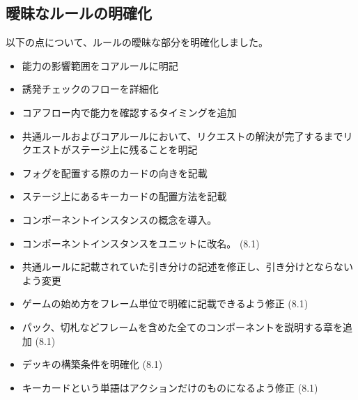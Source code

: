 \documentclass[letterpaper,10pt,dvipdfmx]{sphinxmanual}
\begin{document}
\subsection{曖昧なルールの明確化}
\label{\detokenize{revision-history/8th:id8}}
\sphinxAtStartPar
以下の点について、ルールの曖昧な部分を明確化しました。
\begin{itemize}
\item {} 
\sphinxAtStartPar
能力の影響範囲をコアルールに明記

\item {} 
\sphinxAtStartPar
誘発チェックのフローを詳細化

\item {} 
\sphinxAtStartPar
コアフロー内で能力を確認するタイミングを追加

\item {} 
\sphinxAtStartPar
共通ルールおよびコアルールにおいて、リクエストの解決が完了するまでリクエストがステージ上に残ることを明記

\item {} 
\sphinxAtStartPar
フォグを配置する際のカードの向きを記載

\item {} 
\sphinxAtStartPar
ステージ上にあるキーカードの配置方法を記載

\item {} 
\sphinxAtStartPar
コンポーネントインスタンスの概念を導入。

\item {} 
\sphinxAtStartPar
コンポーネントインスタンスをユニットに改名。 (8.1)

\item {} 
\sphinxAtStartPar
共通ルールに記載されていた引き分けの記述を修正し、引き分けとならないよう変更

\item {} 
\sphinxAtStartPar
ゲームの始め方をフレーム単位で明確に記載できるよう修正 (8.1)

\item {} 
\sphinxAtStartPar
パック、切札などフレームを含めた全てのコンポーネントを説明する章を追加 (8.1)

\item {} 
\sphinxAtStartPar
デッキの構築条件を明確化 (8.1)

\item {} 
\sphinxAtStartPar
キーカードという単語はアクションだけのものになるよう修正 (8.1)

\end{itemize}
\end{document}
